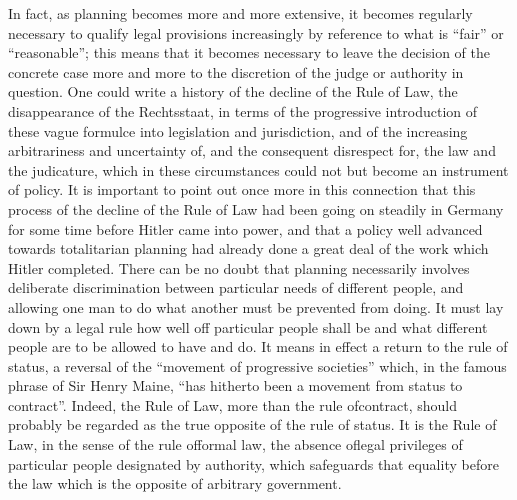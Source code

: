 \documentclass[11pt,openany]{book}
\begin{document}
In fact, as planning becomes more and more extensive, it becomes regularly necessary to qualify legal provisions increasingly by reference to what is ``fair'' or ``reasonable''; this means that it becomes necessary to leave the decision of the concrete case more and more to the discretion of the judge or authority in question. One could write a history of the decline of the Rule of Law, the disappearance of the Rechtsstaat, in terms of the progressive introduction of these vague formulce into legislation and jurisdiction, and of the increasing arbitrariness and uncertainty of, and the consequent disrespect for, the law and the judicature, which in these circumstances could not but become an instrument of policy. It is important to point out once more in this connection that this process of the decline of the Rule of Law had been going on steadily in Germany for some time before Hitler came into power, and that a policy well advanced towards totalitarian planning had already done a great deal of the work which Hitler completed. There can be no doubt that planning necessarily involves deliberate discrimination between particular needs of different people, and allowing one man to do what another must be prevented from doing. It must lay down by a legal rule how well off particular people shall be and what different people are to be allowed to have and do. It means in effect a return to the rule of status, a reversal of the ``movement of progressive societies'' which, in the famous phrase of Sir Henry Maine, ``has hitherto been a movement from status to contract''. Indeed, the Rule of Law, more than the rule ofcontract, should probably be regarded as the true opposite of the rule of status. It is the Rule of Law, in the sense of the rule offormal law, the absence oflegal privileges of particular people designated by authority, which safeguards that equality before the law which is the opposite of arbitrary government.

\begin{center}\textasteriskcentered\hspace{0.9em}\textasteriskcentered\hspace{0.9em}\textasteriskcentered\end{center}

\begin{center}\textasteriskcentered\hspace{0.9em}\textasteriskcentered\hspace{0.9em}\textasteriskcentered\end{center}
\end{document}
